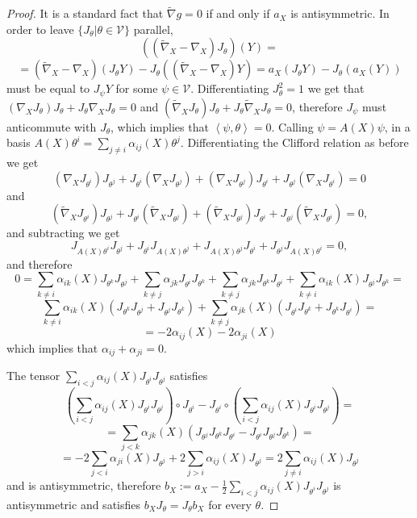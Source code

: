 \documentclass{article}
\newcommand{\ci}[1]{\mathscr{#1}}%
\newcommand{\alfa}{\alpha}
\newcommand{\bra}{\left\langle}
\newcommand{\ket}{\right\rangle}
\newcommand{\rosso}[1]{{\color{red}#1}}
\theoremstyle{definition}
\theoremstyle{remark}
\begin{document}
\begin{proof}
 It is a standard fact that $\widetilde{\nabla}g=0$ if and only if $a_X$ is antisymmetric.
 In order to leave $\{J_{\theta}|\theta\in\ci{V}\}$ parallel,
 $$((\widetilde{\nabla}_X-\nabla_X)J_{\theta})(Y) =$$
 $$= (\widetilde{\nabla}_X-\nabla_X)(J_{\theta}Y)-J_{\theta}((\widetilde{\nabla}_X-\nabla_X)Y)= a_X(J_{\theta}Y) - J_{\theta}(a_X(Y))$$
 must be equal to $J_{\psi}Y$ for some $\psi\in\ci{V}$. Differentiating $J_{\theta}^2=1$ we get that $(\nabla_XJ_{\theta})J_{\theta}+J_{\theta}\nabla_XJ_{\theta}=0$ and $(\widetilde{\nabla}_XJ_{\theta})J_{\theta}+J_{\theta}\widetilde{\nabla}_XJ_{\theta}=0$, therefore $J_{\psi}$ must anticommute with $J_{\theta}$, which implies that $\bra\psi,\theta\ket=0$.
 Calling $\psi=A(X)\psi$, in a basis
 $A(X)\theta^i=\sum_{j\ne i}\alfa_{ij}(X)\theta^j$.
 Differentiating the Clifford relation as before we get
 $$(\nabla_XJ_{\theta^i})J_{\theta^j}+ J_{\theta^i}(\nabla_XJ_{\theta^j})+ (\nabla_XJ_{\theta^j})J_{\theta^i} + J_{\theta^j}(\nabla_XJ_{\theta^i}) =0$$
 and
 $$(\widetilde{\nabla}_XJ_{\theta^i})J_{\theta^j}+ J_{\theta^i}(\widetilde{\nabla}_XJ_{\theta^j})+ (\widetilde{\nabla}_XJ_{\theta^j})J_{\theta^i} + J_{\theta^j}(\widetilde{\nabla}_XJ_{\theta^i}) =0,$$
 and subtracting we get
 $$J_{A(X){\theta^i}}J_{\theta^j} + J_{\theta^i}J_{A(X){\theta^j}} + J_{A(X){\theta^j}}J_{\theta^i} + J_{\theta^j}J_{A(X){\theta^i}} =0,$$
 and therefore
 $$0=\sum_{k\ne i}\alfa_{ik}(X)J_{\theta^k}J_{\theta^j} + \sum_{k\ne j}\alfa_{jk}J_{\theta^i}J_{\theta^k} + \sum_{k\ne j}\alfa_{jk}J_{\theta^k}J_{\theta^i} + \sum_{k\ne i}\alfa_{ik}(X)J_{\theta^j}J_{\theta^k} =$$
 $$\sum_{k\ne i}\alfa_{ik}(X)\left(J_{\theta^k}J_{\theta^j}+J_{\theta^j}J_{\theta^k}\right) + \sum_{k\ne j}\alfa_{jk}(X)\left(J_{\theta^i}J_{\theta^k}+J_{\theta^k}J_{\theta^i}\right)=$$
 $$=-2\alfa_{ij}(X) - 2\alfa_{ji}(X)$$
 which implies that $\alfa_{ij} + \alfa_{ji}=0$.
 
 The tensor $\sum_{i<j}\alfa_{ij}(X)J_{\theta^i}J_{\theta^j}$ satisfies
 $$\left(\sum_{i<j}\alfa_{ij}(X)J_{\theta^i}J_{\theta^j}\right)\circ J_{\theta^i} -J_{\theta^i}\circ\left(\sum_{i<j}\alfa_{ij}(X)J_{\theta^i}J_{\theta^j}\right) =$$
 $$= \sum_{j<k}\alfa_{jk}(X)\left(J_{\theta^j}J_{\theta^k}J_{\theta^i} - J_{\theta^i}J_{\theta^j}J_{\theta^k}\right) = $$
 $$= -2\sum_{j<i}\alfa_{ji}(X)J_{\theta^j} +2\sum_{j>i}\alfa_{ij}(X)J_{\theta^j} = 2\sum_{j\ne i}\alfa_{ij}(X)J_{\theta^j}$$
 and is antisymmetric, therefore $b_X:=a_X-\frac{1}{2}\sum_{i<j}\alfa_{ij}(X)J_{\theta^i}J_{\theta^j}$ is antisymmetric and satisfies $b_XJ_{\theta}=J_{\theta}b_X$ for every $\theta$.
\end{proof}
\end{document}
